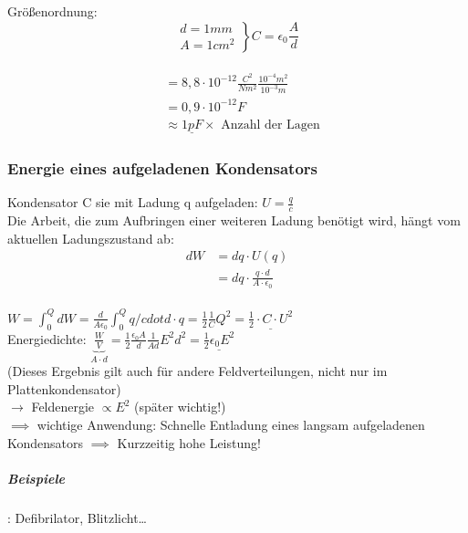 \documentclass[11pt]{article}
\begin{document}
Grö\ss{}enordnung: \begin{equation} \left. \begin{aligned} d=1mm\\ A=1cm^2\end{aligned}\right\}C=\epsilon_0\frac{A}{d}\end{equation}\\
	 \begin{align*}&=8,8\cdot 10^{-12}\frac{C^2}{Nm^2}\frac{10^{-4}m^2}{10^{-3}m}\\
	 &=0,9\cdot 10^{-12}F\\
	 &\approx \underline{1pF} \times \text{ Anzahl der Lagen}
	 \end{align*}

\subsubsection{Energie eines aufgeladenen Kondensators}

Kondensator C sie mit Ladung q aufgeladen: $U=\frac{q}{c}$\\
Die Arbeit, die zum Aufbringen einer weiteren Ladung benötigt wird, hängt vom aktuellen Ladungszustand ab:\\

\begin{align*}
	dW&=dq\cdot U(q)\\
	&=dq\cdot\frac{q\cdot d}{A\cdot \epsilon_0}
\end{align*}\\

$W=\int_0^Q dW= \frac{d}{A\epsilon_0}\int_0^Q q/cdot d\cdot q= \frac{1}{2}\frac{1}{C}Q^2=\underline{\frac{1}{2}\cdot C\cdot U^2} $\\

Energiedichte: $ \underbrace{\frac{W}{V}}_{A\cdot d}=\frac{1}{2}\frac{\epsilon_0A}{d}\frac{1}{Ad}E^2d^2=\underline{\frac{1}{2}\epsilon_0E^2}$\\

(Dieses Ergebnis gilt auch für andere Feldverteilungen, nicht nur im Plattenkondensator)\\
$\rightarrow$ Feldenergie $\propto E^2$ (später wichtig!)\\

$\implies$ wichtige Anwendung: Schnelle Entladung eines langsam aufgeladenen Kondensators $\implies$ Kurzzeitig hohe Leistung!\\
\subparagraph{Beispiele}: Defibrilator, Blitzlicht…\\
\end{document}

